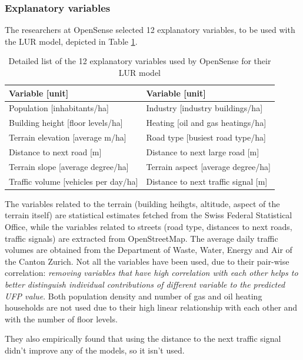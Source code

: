 \documentclass[11pt,a4paper,titlepage]{book}
\begin{document}
\subsubsection{Explanatory variables}
The researchers at OpenSense selected 12 explanatory variables, to be used with the LUR model, depicted in Table \ref{tab:explanatory_vars}.
\begin{table}[ht]
    \centering
    \begin{tabular}[p p]{l l}
         \hline
         Variable [unit] & Variable [unit]\\ [0.5ex] 
         \hline
         Population [inhabitants/ha] & Industry [industry buildings/ha]\\ 
         Building height [floor levels/ha] & Heating [oil and gas heatings/ha] \\
         Terrain elevation [average m/ha] & Road type [busiest road type/ha] \\
         Distance to next road [m] & Distance to next large road [m] \\
         Terrain slope [average degree/ha] & Terrain aspect [average degree/ha] \\
         Traffic volume [vehicles per day/ha] & Distance to next traffic signal [m] \\ [1ex] 
         \hline
    \end{tabular}
    \caption{Detailed list of the 12 explanatory variables used by OpenSense for their LUR model}
    \label{tab:explanatory_vars}
\end{table}
The variables related to the terrain (building heihgts, altitude, aspect of the terrain itself) are statistical estimates fetched from the Swiss Federal Statistical Office, while the variables related to streets (road type, distances to next roads, traffic signals) are extracted from OpenStreetMap. The average daily traffic volumes are obtained from the Department of Waste, Water, Energy and Air of the Canton Zurich.
\newline
\newline
Not all the variables have been used, due to their pair-wise correlation: \textit{removing variables that have high correlation with each other helps to better distinguish individual contributions of different variable to the predicted UFP value}. Both population density and number of gas and oil heating households are not used due to their high linear relationship with each other and with the number of floor levels. 

They also empirically found that using the distance to the next traffic signal didn't improve any of the models, so it isn't used.
\end{document}

